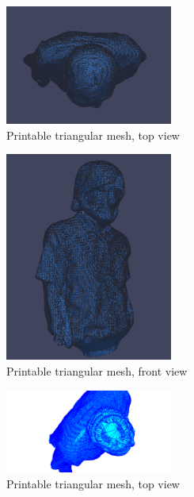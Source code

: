 \begin{figure}[ht!]
  \centering
    \includegraphics[width=0.49\textwidth]{figures/sundinPCLTop.png}
    \caption{Printable triangular mesh, top view}
    \label{fig:sundin-top-pcl}
\end{figure}

\begin{figure}[ht!]
  \centering
    \includegraphics[width=0.49\textwidth]{figures/sundinPCLFront.png}
    \caption{Printable triangular mesh, front view}
    \label{fig:sundin-front-pcl}
\end{figure}



\begin{figure}[ht!]
  \centering
    \includegraphics[width=0.49\textwidth]{figures/3dMesh_sundin_zoom_top.png}
    \caption{Printable triangular mesh, top view}
    \label{fig:sundin-top-zoom}
\end{figure}

